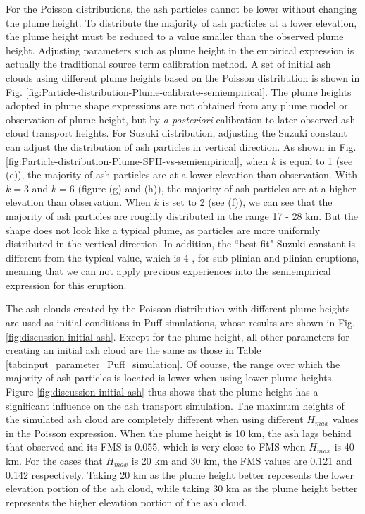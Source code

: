 \documentclass[utf8]{frontiersSCNS} %
\begin{document}
For the Poisson distributions, the ash particles cannot be lower without changing the plume height. To distribute the majority of ash particles at a lower elevation, the plume height must be reduced to a value smaller than the observed plume height. Adjusting parameters such as plume height in the empirical expression is actually the traditional source term calibration method. A set of initial ash clouds using different plume heights based on the Poisson distribution is shown in Fig. \ref{fig:Particle-distribution-Plume-calibrate-semiempirical}. The plume heights adopted in plume shape expressions are not obtained from any plume model or observation of plume height, but by \textit{a posteriori} calibration to later-observed ash cloud transport heights. For Suzuki distribution, adjusting the Suzuki constant can adjust the distribution of ash particles in vertical direction. As shown in Fig. \ref{fig:Particle-distribution-Plume-SPH-vs-semiempirical}, when $k$ is equal to 1 (see (e)), the majority of ash particles are at a lower elevation than observation. With $k=3$ and $k = 6$ (figure (g) and (h)), the majority of ash particles are at a higher elevation than observation. When $k$ is set to 2 (see (f)), we can see that the majority of  ash particles are roughly distributed in the range 17 - 28 km. But the shape does not look like a typical plume, as particles are more uniformly distributed in the vertical direction. In addition, the ``best fit" Suzuki constant is different from the typical value, which is 4 \citep{pfeiffer2005model}, for sub-plinian and plinian eruptions, meaning that we can not apply previous experiences into the semiempirical expression for this eruption.

The ash clouds created by the Poisson distribution with different plume heights are used as initial conditions in Puff simulations, whose results are shown in Fig. \ref{fig:discussion-initial-ash}. Except for the plume height, all other parameters for creating an initial ash cloud are the same as those in Table \ref{tab:input_parameter_Puff_simulation}. Of course, the range over which the majority of ash particles is located is lower when using lower plume heights. 
Figure \ref{fig:discussion-initial-ash} thus shows that the plume height has a significant influence on the ash transport simulation. The maximum heights of the simulated ash cloud are completely different when using different $H_{max}$ values in the Poisson expression. When the plume height is 10 km, the ash lags behind that observed and its FMS is 0.055, which is very close to FMS when $H_{max}$ is 40 km. For the cases that  $H_{max}$ is 20 km and 30 km, the FMS values are 0.121 and 0.142 respectively. Taking 20 km as the plume height better represents the lower elevation portion of the ash cloud, while taking 30 km as the plume height better represents the higher elevation portion of the ash cloud.
\end{document}
